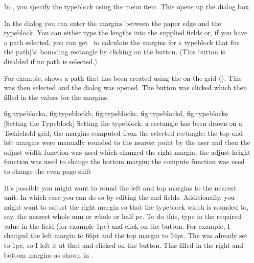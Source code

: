 
In \FlowframTk, you specify the \gls{typeblock} using the
 menu item.  This
opens up the  dialog box.


In the  dialog you can enter the margins
between the paper edge and the \gls{typeblock}. You can either type the
lengths into the supplied fields or, if you have a \gls{path}
selected, you can get \FlowframTk\ to calculate the margins for a
\gls{typeblock} that fits the \gls{path}['s] bounding rectangle by
clicking on the  button.
(This button is disabled if no \gls*{path} is selected.)

For example,  shows a \gls*{path} that
has been created using the  on the
 grid (). This was then selected and the
 dialog was opened. The
 button was clicked
which then filled in the values for the margins.

{
  {fig:typeblocka}{}{},
  {fig:typeblockb}{}{},
  {fig:typeblockc}{}{},
  {fig:typeblockd}{}{},
  {fig:typeblocke}{}{}
}
[Setting the Typeblock]
{Setting the typeblock:
 a rectangle has been drawn on
a Tschichold grid;
 the margins computed from the
selected rectangle;
 the top and left margins were
manually rounded to the nearest point by the user and then the
adjust width function was used which changed the right margin;
 the adjust height function was used to change the
bottom margin;
 the compute function was used to
change the even page shift}

It's possible you might want to round the left and top margins to
the nearest unit. In which case you can do so by editing the
 and
 fields. Additionally, you
might want to adjust the right margin so that the
\gls{typeblock} width is rounded to, say, the nearest whole mm or whole or half
pc. To do this, type in the required value in the
 field (for example
1pc) and click on the 
button. For example, I changed the left margin to 66\gls{pt} and the
top margin to 94\gls{pt}. The
 was already set to
1pc, so I left it at that and clicked on the
 button. This filled in the
right and bottom margins as shown in .

